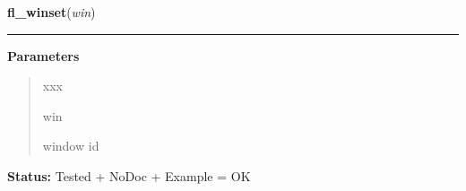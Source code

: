     \label{xformslib:library:fl_winset}

    \vspace{0.5ex}

\hspace{.8\funcindent}\begin{boxedminipage}{\funcwidth}

    \raggedright \textbf{fl\_winset}(\textit{win})

    \vspace{-1.5ex}

    \rule{\textwidth}{0.5\fboxrule}
\setlength{\parskip}{2ex}
\setlength{\parskip}{1ex}
      \textbf{Parameters}
      \vspace{-1ex}

      \begin{quote}
        \begin{Ventry}{xxx}

          \item[win]

          window id

        \end{Ventry}

      \end{quote}

\textbf{Status:} Tested + NoDoc + Example = OK



    \end{boxedminipage}

    \label{xformslib:library:fl_winreparent}

    \vspace{0.5ex}

